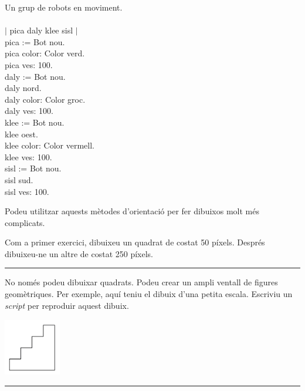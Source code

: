 \begin{script}  Un grup de robots en moviment.
\noindent
\textsf{\upshape
\\
\\$|$ pica daly klee sisl $|$\\
pica := Bot nou.\\
pica color: Color verd.\\
pica ves: 100.\\
daly := Bot nou.\\
daly nord.\\
daly color: Color groc.\\
daly ves: 100.\\
klee := Bot nou.\\
klee oest.\\
klee color: Color vermell.\\
klee ves: 100.\\
sisl := Bot nou.\\
sisl sud.\\
sisl ves: 100.
}
\label{scr3-3}
\end{script}

\vspace*{2mm}

\noindent
Podeu utilitzar aquests mètodes d'orientació per fer dibuixos molt més complicats.

\begin{center}
\colorbox{black}{}
\end{center}
{\small
\noindent
Com a primer exercici, dibuixeu un quadrat de costat 50 píxels. Després dibuixeu-ne un altre de costat 250 píxels.}\\
\noindent
\rule{\textwidth}{3pt}

\newpage

\begin{center}
\colorbox{black}{}
\end{center}
{\small
\noindent
No només podeu dibuixar quadrats. Podeu crear un ampli ventall de figures geomètriques. Per exemple, aquí teniu el dibuix d'una petita escala. Escriviu un \emph{script} per reproduir aquest dibuix.}
\begin{center}
\includegraphics[height=25mm ,width=25mm]{Imatges/figuraE3-4.png}
\end{center}
\noindent
\rule{\textwidth}{3pt}

